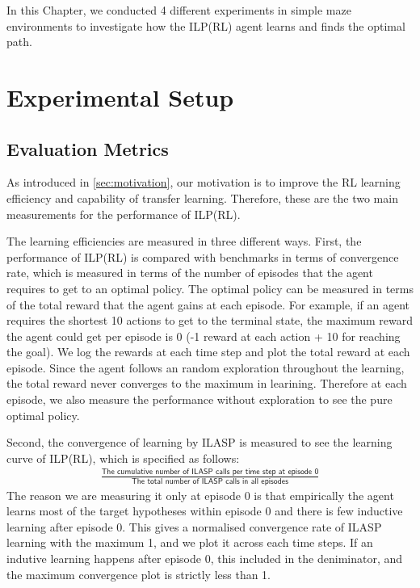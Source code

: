 In this Chapter, we conducted 4 different experiments in simple maze environments to investigate how the ILP(RL) agent learns and finds the optimal path.

\section{Experimental Setup}
\label{sec:experimental_setup}

\subsection{Evaluation Metrics}
\label{subsec:evaluation_metrics}

As introduced in \ref{sec:motivation}, our motivation is to improve the RL learning efficiency and capability of transfer learning.
Therefore, these are the two main measurements for the performance of ILP(RL).

The learning efficiencies are measured in three different ways. First, the performance of ILP(RL) is compared with benchmarks in terms of
convergence rate, which is measured in terms of the number of episodes that the agent requires to get to an optimal policy.
The optimal policy can be measured in terms of the total reward that the agent gains at each episode. 
For example, if an agent requires the shortest 10 actions to get to the terminal state, the maximum reward the agent could get per episode is 0 (-1 reward at each action + 10 for reaching the goal).
We log the rewards at each time step and plot the total reward at each episode. 
Since the agent follows an random exploration throughout the learning, the total reward never converges to the maximum in learining. 
Therefore at each episode, we also measure the performance without exploration to see the pure optimal policy.

Second, the convergence of learning by ILASP is measured to see the learning curve of ILP(RL), which is specified as follows:
\begin{equation}
\begin{split}
\frac{\textsf{The cumulative number of ILASP calls per time step at episode 0}}{\textsf{The total number of ILASP calls in all episodes}}
\end{split}
\end{equation}
The reason we are measuring it only at episode 0 is that empirically the agent learns most of the target hypotheses within episode 0 and there is few inductive learning after episode 0.
This gives a normalised convergence rate of ILASP learning with the maximum 1, and we plot it across each time steps. 
If an indutive learning happens after episode 0, this included in the deniminator, and the maximum convergence plot is strictly less than 1.

